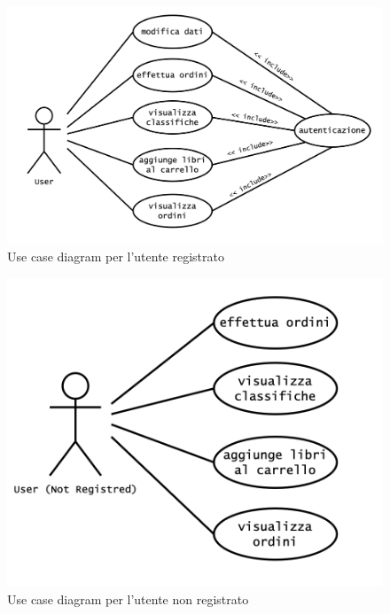 \documentclass[12pt,a4paper]{article}
\begin{document}
	\newpage
	\begin{figure}[h!]
		\centering
		\includegraphics[scale=0.4]{images/UseCaseDiagrams/UserDiagram.png}
		\caption{Use case diagram per l'utente registrato}
	\end{figure}
	\vspace{20px}
	\begin{figure}[h!]
		\centering
		\includegraphics[scale=0.4]{images/UseCaseDiagrams/UserNotRegistredDiagram.png}
		\caption{Use case diagram per l'utente non registrato}
	\end{figure}
	\renewcommand{\arraystretch}{2.0}
	\setlength{\tabcolsep}{15pt}
	\newpage
\end{document}
